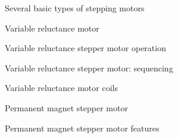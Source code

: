 \documentclass[compress]{beamer}
\begin{document}
{
    \begin{frame}{Several basic types of stepping motors}
    \end{frame}
}

{
    \begin{frame}{Variable reluctance motor}
    \end{frame}
}

{
    \begin{frame}{Variable reluctance stepper motor operation}
    \end{frame}
}

{
    \begin{frame}{Variable reluctance stepper motor: sequencing}
    \end{frame}
}

{
    \begin{frame}{Variable reluctance motor coils}
    \end{frame}
}

{
    \begin{frame}{Permanent magnet stepper motor}
    \end{frame}
}

{
    \begin{frame}{Permanent magnet stepper motor features}
    \end{frame}
}
\end{document}
